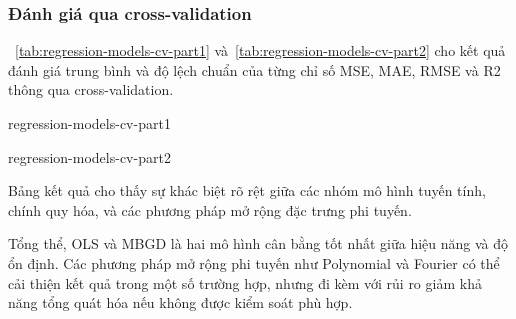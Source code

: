 \subsubsection{Đánh giá qua cross-validation}

\tablename~\ref{tab:regression-models-cv-part1}
và~\ref{tab:regression-models-cv-part2} cho kết quả đánh giá trung bình và độ
lệch chuẩn của từng chỉ số MSE, MAE, RMSE và R2 thông qua cross-validation.

\begin{table}[htbp]
  \centering
  \caption{Kết quả các chi số của các mô hình hồi quy qua cross-validation
  (phần 1)}
  \label{tab:regression-models-cv-part1}
  {regression-models-cv-part1}
\end{table}

\begin{table}[htbp]
  \centering
  \caption{Kết quả các chi số của các mô hình hồi quy qua cross-validation
  (phần 2)}
  \label{tab:regression-models-cv-part2}
  {regression-models-cv-part2}
\end{table}

Bảng kết quả cho thấy sự khác biệt rõ rệt giữa các nhóm mô hình tuyến tính,
chính quy hóa, và các phương pháp mở rộng đặc trưng phi tuyến.


\par

\par

\par

Tổng thể, OLS và MBGD là hai mô hình cân bằng tốt nhất giữa hiệu năng và độ ổn
định. Các phương pháp mở rộng phi tuyến như Polynomial và Fourier có thể cải
thiện kết quả trong một số trường hợp, nhưng đi kèm với rủi ro giảm khả năng
tổng quát hóa nếu không được kiểm soát phù hợp.

